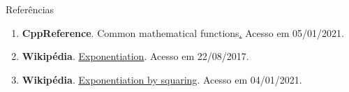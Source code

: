 \begin{frame}[fragile]{Referências}

    \begin{enumerate}
        \item \textbf{CppReference}. {Common mathematical functions}\href{https://en.cppreference.com/w/cpp/numeric/math}. Acesso em 05/01/2021.

       \item \textbf{Wikipédia}. \href{https://en.wikipedia.org/wiki/Exponentiation}{Exponentiation}. Acesso em 22/08/2017.

        \item \textbf{Wikipédia}. \href{https://en.wikipedia.org/wiki/Exponentiation_by_squaring}{Exponentiation by squaring}. Acesso em 04/01/2021.
    \end{enumerate}

\end{frame}
